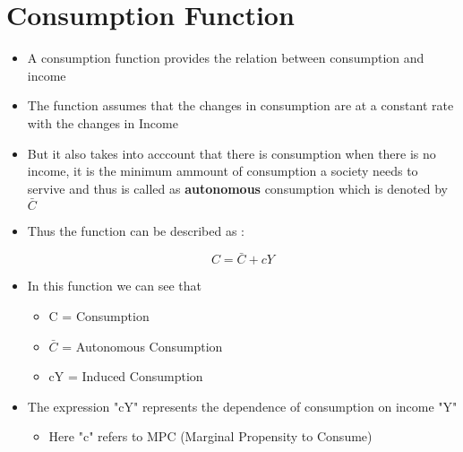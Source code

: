 \documentclass[11pt]{article}
\begin{document}
\section{Consumption Function}
\label{sec:orgab748d1}
\begin{itemize}
\item A consumption function provides the relation between consumption and income
\item The function assumes that the changes in consumption are at a constant rate with the changes in Income
\item But it also takes into acccount that there is consumption when there is no income, it is the minimum ammount of consumption a society needs to servive and thus is called as \textbf{autonomous} consumption which is denoted by \(\bar{C}\)
\item Thus the function can be described as :

$$
  C = \bar{C} + cY
  $$

\item In this function we can see that
\begin{itemize}
\item C = Consumption

\item \(\bar{C}\) = Autonomous Consumption

\item cY = Induced Consumption
\end{itemize}
\item The expression "cY" represents the dependence of consumption on income "Y"
\begin{itemize}
\item Here "c" refers to MPC (Marginal Propensity to Consume)
\end{itemize}
\end{itemize}
\end{document}
